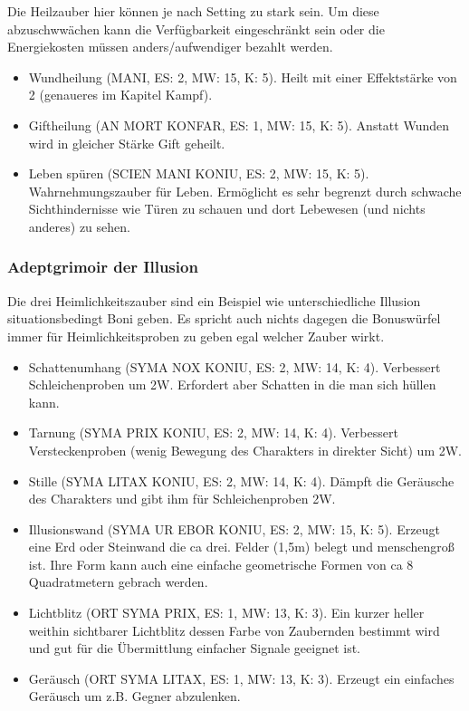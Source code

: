 \documentclass{article}
\begin{document}
Die Heilzauber hier können je nach Setting zu stark sein. Um diese abzuschwwächen kann die Verfügbarkeit eingeschränkt
sein oder die Energiekosten müssen anders/aufwendiger bezahlt werden.

\begin{itemize}
\item Wundheilung (MANI, ES: 2, MW: 15, K: 5). Heilt mit einer Effektstärke von 2 (genaueres im Kapitel Kampf).
\item Giftheilung (AN MORT KONFAR, ES: 1, MW: 15, K: 5). Anstatt Wunden wird in gleicher Stärke Gift geheilt.
\item Leben spüren (SCIEN MANI KONIU, ES: 2, MW: 15, K: 5). Wahrnehmungszauber für Leben. Ermöglicht es sehr begrenzt durch schwache Sichthindernisse wie Türen zu schauen und dort Lebewesen (und nichts anderes) zu sehen.
\end{itemize}

\subsubsection{Adeptgrimoir der Illusion}

Die drei Heimlichkeitszauber sind ein Beispiel wie unterschiedliche Illusion situationsbedingt Boni geben. Es spricht
auch nichts dagegen die Bonuswürfel immer für Heimlichkeitsproben zu geben egal welcher Zauber wirkt.

\begin{itemize}
\item Schattenumhang (SYMA NOX KONIU, ES: 2, MW: 14, K: 4). Verbessert Schleichenproben um 2W. Erfordert aber Schatten in die man sich hüllen kann.
\item Tarnung (SYMA PRIX KONIU, ES: 2, MW: 14, K: 4). Verbessert Versteckenproben (wenig Bewegung des Charakters in direkter Sicht) um 2W.
\item Stille (SYMA LITAX KONIU, ES: 2, MW: 14, K: 4). Dämpft die Geräusche des Charakters und gibt ihm für Schleichenproben 2W.
\item Illusionswand (SYMA UR EBOR KONIU, ES: 2, MW: 15, K: 5). Erzeugt eine Erd oder Steinwand die ca drei. Felder (1,5m) belegt und menschengroß ist. Ihre Form kann auch eine einfache geometrische Formen von ca 8 Quadratmetern gebrach werden.
\item Lichtblitz (ORT SYMA PRIX, ES: 1, MW: 13, K: 3). Ein kurzer heller weithin sichtbarer Lichtblitz dessen Farbe von Zaubernden bestimmt wird und gut für die Übermittlung einfacher Signale geeignet ist.
\item Geräusch (ORT SYMA LITAX, ES: 1, MW: 13, K: 3). Erzeugt ein einfaches Geräusch um z.B. Gegner abzulenken.
\end{itemize}
\end{document}
